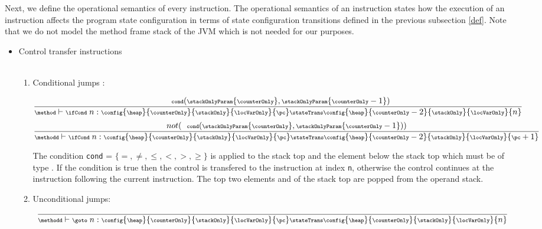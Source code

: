    
 Next, we define the operational semantics of every instruction. The operational semantics
 of an instruction states how the execution of an instruction affects the program state configuration 
 in terms of state configuration transitions defined in the previous subsection \ref{def}.
 Note that we do not model the method frame stack of the JVM which is not needed for our purposes. 

\begin{itemize}
       \item Control transfer instructions \\\\

        \begin{enumerate}
            \item Conditional jumps : \ifCond


        $$ 
           {\scriptsize \frac{ \mbox{ \rm \texttt{ cond}}( \stackOnlyParam{\counterOnly}, \stackOnlyParam{\counterOnly - 1}) } 			       		               
                      {\method \vdash \ifCond \ n : \config{\heap }{\counterOnly}{\stackOnly}{\locVarOnly}{\pc}
		                      \stateTrans 
				      \config{\heap}{\counterOnly - 2}{\stackOnly}{\locVarOnly}{n}} 
            }    $$
		$$ {\scriptsize
                 \frac{  not (\mbox{ \rm \texttt{ cond}}( \stackOnlyParam{\counterOnly}, \stackOnlyParam{\counterOnly - 1})) }		                             
                     {\methodd \vdash \ifCond \ n : \config{\heap}{\counterOnly}{\stackOnly}{\locVarOnly}{\pc} 
		                    \stateTrans 
                                    \config{\heap}{\counterOnly - 2}{\stackOnly}{\locVarOnly}{\pc + 1}} }
           $$
            

	    The condition \texttt{cond} = $\{ =, \neq, \le, <, >, \ge \} $ is applied to the stack top  \stackOnlyParam{\counterOnly} and the element below the stack top
	     which must be of type \Myint. If the condition is true then the control is transfered to the instruction
	    at index \texttt{n}, otherwise the control continues at the instruction following the current instruction. The top two elements \stackOnlyParam{\counterOnly} and
              of the stack top are popped from the operand stack.
 
        \item Unconditional jumps: \goto \\
            $${\scriptsize \frac{  }
	            {\methodd \vdash \goto \ n: \config{\heap}{\counterOnly}{\stackOnly}{\locVarOnly}{\pc} 
		                    \stateTrans 
                                    \config{\heap}{\counterOnly}{\stackOnly}{\locVarOnly}{ n}} }$$
				    

\end{enumerate}
\end{itemize}
